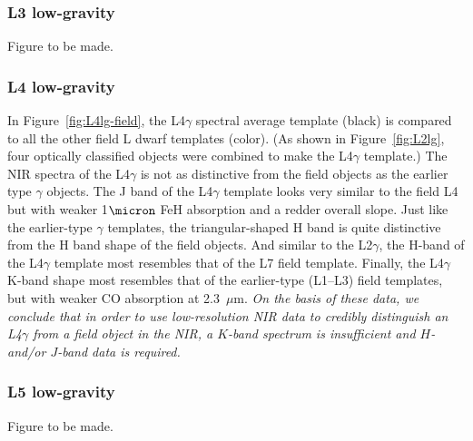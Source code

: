 \documentclass[12pt,preprint]{aastex}
\begin{document}
\subsubsection{L3 low-gravity}
Figure to be made.

\subsubsection{L4 low-gravity}
In Figure~\ref{fig:L4lg-field}, the L4$\gamma$ spectral average template (black) is compared to all the other field L dwarf templates (color). (As shown in Figure~\ref{fig:L2lg}, four optically classified objects were combined to make the L4$\gamma$ template.) 
The NIR spectra of the L4$\gamma$ is not as distinctive from the field objects as the earlier type $\gamma$ objects. 
The J band of the L4$\gamma$ template looks very similar to the field L4 but with weaker 1$\micron$ FeH absorption and a redder overall slope. 
Just like the earlier-type $\gamma$ templates, the triangular-shaped H band is quite distinctive from the H band shape of the field objects. And similar to the L2$\gamma$, the H-band of the L4$\gamma$ template most resembles that of the L7 field template.
Finally, the L4$\gamma$ K-band shape most resembles that of the earlier-type (L1--L3) field templates, but with weaker CO absorption at 2.3~$\mu$m.
\emph{On the basis of these data, we conclude that in order to use low-resolution NIR data to credibly distinguish an L4$\gamma$ from a field object in the NIR, a $K$-band spectrum is insufficient and $H$- and/or $J$-band data is required.}

\subsubsection{L5 low-gravity}
Figure to be made.


% 
\end{document}
